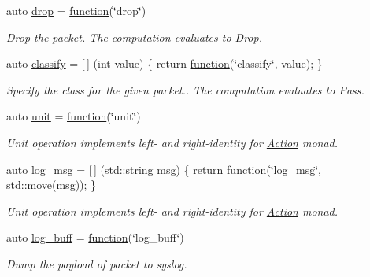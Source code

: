 \begin{DoxyCompactItemize}
auto \hyperlink{namespacepfq_1_1lang_1_1anonymous__namespace_02default_8hpp_03_a0d715988e000ac6284a1615091eb4067}{drop} = \hyperlink{namespacepfq_1_1lang_a1a4638059d700ae08d0ca63886ff2bb3}{function}(\char`\"{}drop\char`\"{})
\begin{DoxyCompactList}\small\item\em Drop the packet. The computation evaluates to {\ttfamily Drop}. \end{DoxyCompactList}\item 
auto \hyperlink{namespacepfq_1_1lang_1_1anonymous__namespace_02default_8hpp_03_a4f0a980be076a3958156b7053ac06912}{classify} = \mbox{[}$\,$\mbox{]} (int value) \{ return \hyperlink{namespacepfq_1_1lang_a1a4638059d700ae08d0ca63886ff2bb3}{function}(\char`\"{}classify\char`\"{}, value); \}
\begin{DoxyCompactList}\small\item\em Specify the class for the given packet.. The computation evaluates to {\ttfamily Pass}. \end{DoxyCompactList}\item 
auto \hyperlink{namespacepfq_1_1lang_1_1anonymous__namespace_02default_8hpp_03_a85f9b2d401cbb1d135679160de0e97de}{unit} = \hyperlink{namespacepfq_1_1lang_a1a4638059d700ae08d0ca63886ff2bb3}{function}(\char`\"{}unit\char`\"{})
\begin{DoxyCompactList}\small\item\em Unit operation implements left-\/ and right-\/identity for \hyperlink{structpfq_1_1lang_1_1Action}{Action} monad. \end{DoxyCompactList}\item 
auto \hyperlink{namespacepfq_1_1lang_1_1anonymous__namespace_02default_8hpp_03_a82e76226844f043aac9a2dd01615c9bb}{log\+\_\+msg} = \mbox{[}$\,$\mbox{]} (std\+::string msg) \{ return \hyperlink{namespacepfq_1_1lang_a1a4638059d700ae08d0ca63886ff2bb3}{function}(\char`\"{}log\+\_\+msg\char`\"{}, std\+::move(msg)); \}
\begin{DoxyCompactList}\small\item\em Unit operation implements left-\/ and right-\/identity for \hyperlink{structpfq_1_1lang_1_1Action}{Action} monad. \end{DoxyCompactList}\item 
auto \hyperlink{namespacepfq_1_1lang_1_1anonymous__namespace_02default_8hpp_03_ac16d4c4b496e6e882901d84ded462101}{log\+\_\+buff} = \hyperlink{namespacepfq_1_1lang_a1a4638059d700ae08d0ca63886ff2bb3}{function}(\char`\"{}log\+\_\+buff\char`\"{})
\begin{DoxyCompactList}\small\item\em Dump the payload of packet to syslog. \end{DoxyCompactList}\item 

\end{DoxyCompactItemize}
